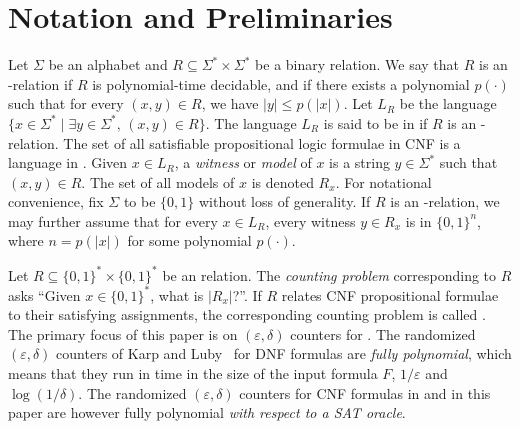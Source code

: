 \section{Notation and Preliminaries}\label{sec:prelims}

Let $\Sigma$ be an alphabet and $R \subseteq \Sigma^* \times \Sigma^*$
be a binary relation.  We say that $R$ is an -relation if $R$
is polynomial-time decidable, and if there exists a polynomial
$p(\cdot)$ such that for every $(x, y) \in R$, we have $|y| \le
p(|x|)$.  Let $L_R$ be the language $\{x \in \Sigma^* \mid \exists y
\in \Sigma^*,\, (x, y) \in R\}$.  The language $L_R$ is said to be in
 if $R$ is an -relation.  The set of all satisfiable
propositional logic formulae in CNF is a language in .  
Given $x \in L_R$, a \emph{witness} or \emph{model} of $x$
is a string $y \in \Sigma^*$ such that $(x, y) \in R$.  The set of all
models of $x$ is denoted $R_x$.  For notational convenience,
fix $\Sigma$ to be $\{0, 1\}$ without loss of generality.  If $R$ is
an -relation, we may further assume that for every $x \in L_R$,
every witness $y \in R_x$ is in $\{0, 1\}^n$, where $n = p(|x|)$ for
some polynomial $p(\cdot)$.

Let $R \subseteq \{0,1\}^* \times \{0,1\}^*$ be an  relation.
The \emph{counting problem} corresponding to $R$ asks ``Given $x \in
\{0,1\}^*$, what is $|R_x|$?''.  If $R$ relates CNF propositional
formulae to their satisfying assignments, the corresponding counting
problem is called {\sharpSAT}.  The primary focus of this paper is on
$(\varepsilon, \delta)$ counters for {\sharpSAT}.  The randomized
$(\varepsilon, \delta)$ counters of Karp and Luby~\cite{KarpLuby1989}
for DNF formulas are \emph{fully polynomial}, which means that
they run in time  in the size of the input 
formula $F$, $1/\varepsilon$ and $\log(1/\delta)$.  The randomized 
$(\varepsilon, \delta)$ counters for CNF formulas in \cite{Jerr}
and in this paper are however fully polynomial \emph{with respect to a SAT oracle}.

